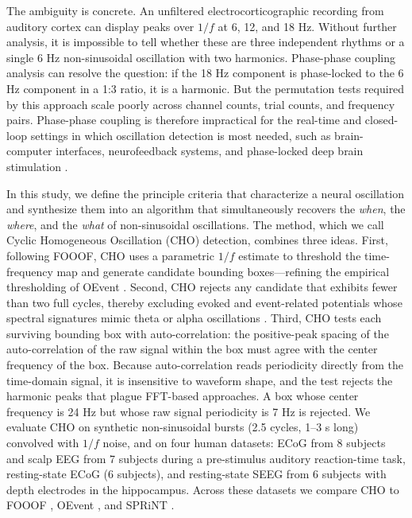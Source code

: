The ambiguity is concrete. An unfiltered electrocorticographic recording from auditory cortex can display peaks over $1/f$ at 6, 12, and 18 Hz. Without further analysis, it is impossible to tell whether these are three independent rhythms or a single 6 Hz non-sinusoidal oscillation with two harmonics. Phase-phase coupling analysis \citep{belluscio2012crossfrequency} can resolve the question: if the 18 Hz component is phase-locked to the 6 Hz component in a 1:3 ratio, it is a harmonic. But the permutation tests required by this approach scale poorly across channel counts, trial counts, and frequency pairs. Phase-phase coupling is therefore impractical for the real-time and closed-loop settings in which oscillation detection is most needed, such as brain-computer interfaces, neurofeedback systems, and phase-locked deep brain stimulation \citep{cagnan2017phase,schalk2004bci2000}.

In this study, we define the principle criteria that characterize a neural oscillation and synthesize them into an algorithm that simultaneously recovers the \emph{when}, the \emph{where}, and the \emph{what} of non-sinusoidal oscillations. The method, which we call Cyclic Homogeneous Oscillation (CHO) detection, combines three ideas. First, following FOOOF, CHO uses a parametric $1/f$ estimate to threshold the time-frequency map and generate candidate bounding boxes---refining the empirical thresholding of OEvent \citep{neymotin2022oevent}. Second, CHO rejects any candidate that exhibits fewer than two full cycles, thereby excluding evoked and event-related potentials whose spectral signatures mimic theta or alpha oscillations \citep{decheveigne2019filters}. Third, CHO tests each surviving bounding box with auto-correlation: the positive-peak spacing of the auto-correlation of the raw signal within the box must agree with the center frequency of the box. Because auto-correlation reads periodicity directly from the time-domain signal, it is insensitive to waveform shape, and the test rejects the harmonic peaks that plague FFT-based approaches. A box whose center frequency is 24 Hz but whose raw signal periodicity is 7 Hz is rejected. We evaluate CHO on synthetic non-sinusoidal bursts (2.5 cycles, 1--3 s long) convolved with $1/f$ noise, and on four human datasets: ECoG from 8 subjects and scalp EEG from 7 subjects during a pre-stimulus auditory reaction-time task, resting-state ECoG (6 subjects), and resting-state SEEG from 6 subjects with depth electrodes in the hippocampus. Across these datasets we compare CHO to FOOOF \citep{donoghue2020parameterizing}, OEvent \citep{neymotin2022oevent}, and SPRiNT \citep{wilson2022sprint}.

